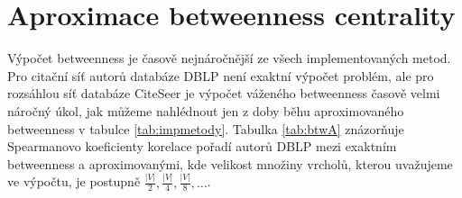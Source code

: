 \documentclass{bakalarka}
\begin{document}
\begin{table}[!ht]
\begin{center}
\end{center}
\caption{Součty pořadí oceněných autorů}
\label{tab:oceneni1}
\end{table}

\section{Aproximace betweenness centrality}
Výpočet betweenness je časově nejnáročnější ze všech implementovaných metod.
Pro citační síť autorů databáze DBLP není exaktní výpočet problém, ale pro
rozsáhlou síť databáze CiteSeer je výpočet váženého betweenness časově velmi
náročný úkol, jak můžeme nahlédnout jen z doby běhu aproximovaného betweenness
v tabulce \ref{tab:impmetody}.  Tabulka \ref{tab:btwA} znázorňuje Spearmanovo
koeficienty korelace pořadí autorů DBLP mezi exaktním betweenness a
aproximovanými, kde velikost množiny vrcholů, kterou uvažujeme ve výpočtu, je
postupně $\frac{|V|}{2}, \frac{|V|}{4}, \frac{|V|}{8}, \ldots$.
\end{document}
